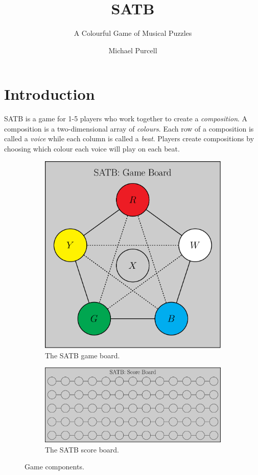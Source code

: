 \documentclass{scrartcl}
\title{SATB}
\subtitle{A Colourful Game of Musical Puzzles}
\author{Michael Purcell}
\date{}
\numberwithin{example}{section}
\begin{document}
\maketitle
\section{Introduction}\label{section:introduction}
SATB is a game for 1-5 players who work together to create a \emph{composition}.
A composition is a two-dimensional array of \emph{colours}.   
Each row of a composition is called a \emph{voice} while
each column is called a \emph{beat}.
Players create compositions by choosing which colour each voice will play on
each beat. 

\begin{figure}[ht]
\centering
\begin{subfigure}[t]{0.4\textwidth}
\includegraphics[width=\textwidth]{game_board.pdf}
\caption{The SATB game board.}
\end{subfigure}
\qquad
\begin{subfigure}[t]{0.4\textwidth}
\includegraphics[width=\textwidth]{score_board.pdf}
\caption{The SATB score board.}
\end{subfigure}
\caption{Game components.}
\end{figure}
\end{document}
